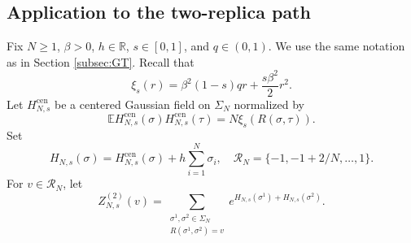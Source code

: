 \documentclass[11pt]{article}
\numberwithin{equation}{section}
\newcommand{\E}{\mathbb{E}}
\newcommand{\1}{\mathbf 1}
\begin{document}
\subsection{Application to the two-replica path}
Fix $N\geq1$, $\beta>0$, $h\in\mathbb R$, $s\in[0,1]$, and $q\in(0,1)$.
We use the same notation as in Section \ref{subsec:GT}. Recall that
\[
\xi_s(r)
=
\beta^2(1-s)qr+\frac{s\beta^2}{2}r^2.
\]
Let $H_{N,s}^{\mathrm{cen}}$ be a centered Gaussian field on
$\Sigma_N$ normalized by
\begin{equation}
\E H_{N,s}^{\mathrm{cen}}(\sigma)
H_{N,s}^{\mathrm{cen}}(\tau)
=N\xi_s(R(\sigma,\tau)).
\label{eq:appendix-exact-covariance}
\end{equation}
Set
\[
H_{N,s}(\sigma)=H_{N,s}^{\mathrm{cen}}(\sigma)
+h\sum_{i=1}^N\sigma_i,\quad 
\mathcal R_N=\{-1,-1+2/N,\ldots,1\}.
\]
For $v\in\mathcal R_N$, let
\begin{equation}
Z_{N,s}^{(2)}(v)=
\sum_{\substack{\sigma^1,\sigma^2\in\Sigma_N\\
R(\sigma^1,\sigma^2)=v}}
e^{H_{N,s}(\sigma^1)+H_{N,s}(\sigma^2)}.
\label{eq:appendix-constrained-partition}
\end{equation}
\end{document}
